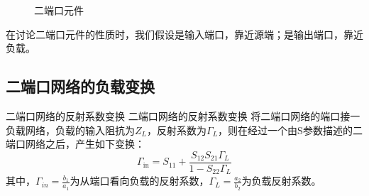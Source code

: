 \begin{figure}[h!]
\begin{center}
    \end{center}
    \caption{\kaishu 二端口元件}\label{Fig: 二端口元件}
\end{figure}

在讨论二端口元件的性质时，我们假设是输入端口，靠近源端；是输出端口，靠近负载。

    \subsection{二端口网络的负载变换}
    \begin{theorem}
    {二端口网络的反射系数变换}
    {二端口网络的反射系数变换}
        将二端口网络的端口接一负载网络，负载的输入阻抗为$Z_L$，反射系数为$\varGamma_L$，则在经过一个由S参数描述的二端口网络之后，产生如下变换：
        \begin{equation}
            \varGamma_\mathrm{in}=S_{11}+\frac{S_{12}S_{21}\varGamma_L}{1-S_{22}\varGamma_L}
        \end{equation}
        其中，$\varGamma_{in}=\frac{b_1}{a_1}$为从端口看向负载的反射系数，$\varGamma_L=\frac{a_2}{b_2}$为负载反射系数。        
    \end{theorem}



